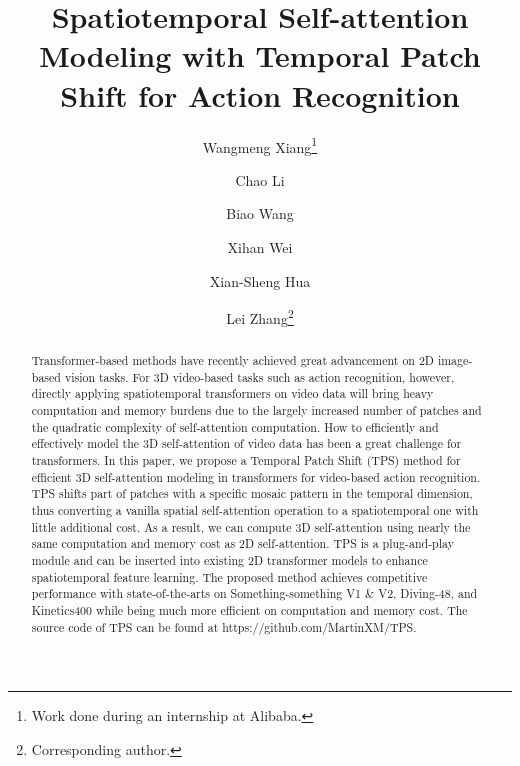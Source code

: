 \documentclass[runningheads]{llncs}
\begin{document}
\pagestyle{headings}
	\mainmatter
	\def\ECCVSubNumber{334}  

	\title{Spatiotemporal Self-attention Modeling with Temporal Patch Shift for Action Recognition} 

\begin{comment}
	\titlerunning{ECCV-22 submission ID \ECCVSubNumber} 
	\authorrunning{ECCV-22 submission ID \ECCVSubNumber} 
	\author{Anonymous ECCV submission}
	\institute{Paper ID \ECCVSubNumber}
	\end{comment}


\author{Wangmeng Xiang\thanks{Work done during an internship at Alibaba.} \and
		Chao Li \and
		Biao Wang  \and
		Xihan Wei \and
		Xian-Sheng Hua \and
		Lei Zhang\thanks{Corresponding author.}
	}
\maketitle
	
	\begin{abstract}
		
		Transformer-based methods have recently achieved great advancement on 2D image-based vision tasks. For 3D video-based tasks such as action recognition, however, directly applying spatiotemporal transformers on video data will bring heavy computation and memory burdens due to the largely increased number of patches and the quadratic complexity of self-attention computation. How to efficiently and effectively model the 3D self-attention of video data has been a great challenge for transformers. In this paper, we propose a Temporal Patch Shift (TPS) method for efficient 3D self-attention modeling in transformers for video-based action recognition. TPS shifts part of patches with a specific mosaic pattern in the temporal dimension, thus converting a vanilla spatial self-attention operation to a spatiotemporal one with little additional cost. As a result, we can compute 3D self-attention using nearly the same computation and memory cost as 2D self-attention. TPS is a plug-and-play module and can be inserted into existing 2D transformer models to enhance spatiotemporal feature learning. The proposed method achieves competitive performance with state-of-the-arts on Something-something V1 \& V2, Diving-48, and Kinetics400 while being much more efficient on computation and memory cost. The source code of TPS can be found at https://github.com/MartinXM/TPS.
		
	\end{abstract}
	
\end{document}
